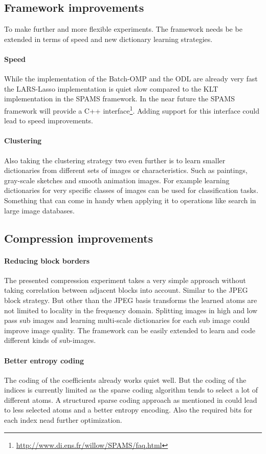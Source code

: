 \subsection{Framework improvements}
To make further and more flexible experiments. The framework needs be be
extended in terms of speed and new dictionary learning strategies.

\paragraph{Speed}
While the implementation of the Batch-OMP and the ODL are already very fast
the LARS-Lasso implementation is quiet slow compared to the KLT implementation
in the SPAMS framework. In the near future the SPAMS framework will provide a
C++ interface\footnote{\url{http://www.di.ens.fr/willow/SPAMS/faq.html}}. Adding
support for this interface could lead to speed improvements. 

\paragraph{Clustering}
Also taking the clustering strategy two even further is to learn smaller
dictionaries from different sets of images or characteristics. Such as
paintings, gray-scale sketches and smooth animation images. For example
learning dictionaries for very specific classes of images can be used for
classification tasks. Something that can come in handy when applying it to
operations like search in large image databases.


\subsection{Compression improvements}
\paragraph{Reducing block borders} The presented compression experiment
takes a very simple approach without taking correlation between adjacent
blocks into account. Similar to the JPEG block strategy. But other than
the JPEG basis transforms the learned atoms are not limited to locality in
the frequency domain. Splitting images in high and low pass sub images and
learning multi-scale dictionaries for each sub image could improve image
quality. The framework can be easily extended to learn and code different kinds
of sub-images.

\paragraph{Better entropy coding}
The coding of the coefficients already works quiet well. But the coding of the
indices is currently limited as the sparse coding algorithm tends to select a
lot of different atoms. A structured sparse coding approach as mentioned in
 could lead to less selected atoms and a better
entropy encoding. Also the required bits for each index nead further
optimization.









